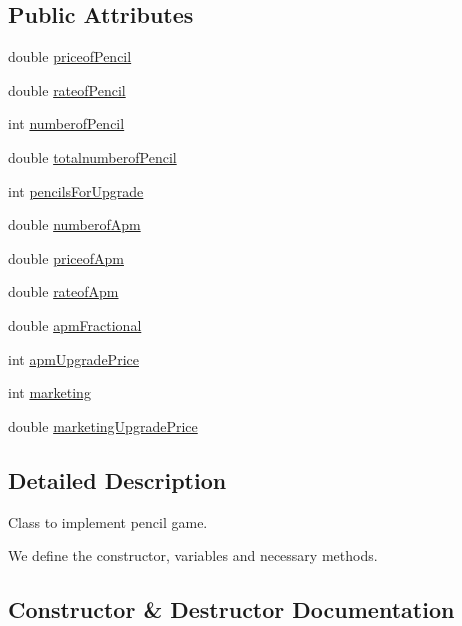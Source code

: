 \subsection*{Public Attributes}
\begin{DoxyCompactItemize}
\item 
double \hyperlink{classPencil_a71779a08ea791bf285d7e7d901d49d96}{priceof\+Pencil}
\item 
double \hyperlink{classPencil_acc8e87622507eb7d7b6802c561bbf4b5}{rateof\+Pencil}
\item 
int \hyperlink{classPencil_a42f809cbd4230815aed7212fe148367c}{numberof\+Pencil}
\item 
double \hyperlink{classPencil_a80b094bc36884ba078bc6e07c56871af}{totalnumberof\+Pencil}
\item 
int \hyperlink{classPencil_a0af93e74decc39b154f1248c2a987809}{pencils\+For\+Upgrade}
\item 
double \hyperlink{classPencil_a07127489c562b29b05f439ea380db9d0}{numberof\+Apm}
\item 
double \hyperlink{classPencil_a34a1a763466d2ea7408bf470adcf63f2}{priceof\+Apm}
\item 
double \hyperlink{classPencil_a5b8822d01032897b432fff6ac20d6fb5}{rateof\+Apm}
\item 
double \hyperlink{classPencil_a71b50db432298677e50884b34002bbcf}{apm\+Fractional}
\item 
int \hyperlink{classPencil_a1f05477be34cb47d39c3888fb1c4092c}{apm\+Upgrade\+Price}
\item 
int \hyperlink{classPencil_a1bc69bd5b4a595710c48d68a2d276044}{marketing}
\item 
double \hyperlink{classPencil_a4d8be35743fd0687fcc95a4643594568}{marketing\+Upgrade\+Price}
\end{DoxyCompactItemize}


\subsection{Detailed Description}
Class to implement pencil game. 

We define the constructor, variables and necessary methods. 

\subsection{Constructor \& Destructor Documentation}
\mbox{\label{classPencil_a0dbfad3eebde26e9d5dacace449d9e14}} 
